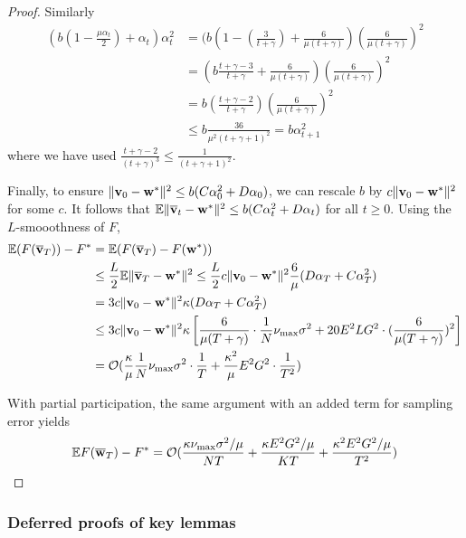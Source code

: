 \begin{proof}
Similarly 
\begin{align*}
(b(1-\frac{\mu\alpha_{t}}{2})+\alpha_{t})\alpha_{t}^{2} & =(b(1-(\frac{3}{t+\gamma})+\frac{6}{\mu(t+\gamma)})(\frac{6}{\mu(t+\gamma)})^{2}\\
& =(b\frac{t+\gamma-3}{t+\gamma}+\frac{6}{\mu(t+\gamma)})(\frac{6}{\mu(t+\gamma)})^{2}\\
& =b(\frac{t+\gamma-2}{t+\gamma})(\frac{6}{\mu(t+\gamma)})^{2}\\
& \leq b\frac{36}{\mu^{2}(t+\gamma+1)^{2}}=b\alpha_{t+1}^{2}
\end{align*}
where we have used $\frac{t+\gamma-2}{(t+\gamma)^{3}}\leq\frac{1}{(t+\gamma+1)^{2}}$.

Finally, to ensure $\|{\mathbf{v}}_{0}-{\mathbf{w}}^{\ast}\|^{2}\leq b(C\alpha_{0}^{2}+D\alpha_{0})$,
we can rescale $b$ by $c\|{\mathbf{v}}_{0}-{\mathbf{w}}^{\ast}\|^{2}$ for some $c.$ It
follows that $\mathbb{E}\|{\overline{\mathbf{v}}}_{t}-{\mathbf{w}}^{\ast}\|^{2}\leq b(C\alpha_{t}^{2}+D\alpha_{t})$
for all $t\geq0$. Using the $L$-smooothness of $F$,
\begin{align*}
\mathbb{E}(F({\overline{\mathbf{v}}}_{T}))-F^{\ast} & =\mathbb{E}(F({\overline{\mathbf{v}}}_{T})-F({\mathbf{w}}^{\ast}))\\
& \leq\frac{L}{2}\mathbb{E}\|{\overline{\mathbf{v}}}_{T}-{\mathbf{w}}^{\ast}\|^{2}\leq\frac{L}{2}c\|{\mathbf{v}}_{0}-{\mathbf{w}}^{\ast}\|^{2}\frac{6}{\mu}(D\alpha_{T}+C\alpha_{T}^{2})\\
& =3c\|{\mathbf{v}}_{0}-{\mathbf{w}}^{\ast}\|^{2}\kappa(D\alpha_{T}+C\alpha_{T}^{2})\\
& \leq3c\|{\mathbf{v}}_{0}-{\mathbf{w}}^{\ast}\|^{2}\kappa\left[\frac{6}{\mu(T+\gamma)}\cdot\frac{1}{N}\nu_{\max}\sigma^{2}+20E^{2}LG^{2}\cdot(\frac{6}{\mu(T+\gamma)})^{2}\right]\\
& =\mathcal{O}(\frac{\kappa}{\mu}\frac{1}{N}\nu_{\max}\sigma^{2}\cdot\frac{1}{T}+\frac{\kappa^{2}}{\mu}E^{2}G^{2}\cdot\frac{1}{T^{2}})
\end{align*}

With partial participation, the same argument with an added term for sampling error yields
\begin{align*}
\mathbb{E}F({\overline{\mathbf{w}}}_{T})-F^{\ast}=\mathcal{O}(\frac{\kappa\nu_{\max}\sigma^{2}/\mu}{NT}+\frac{\kappa E^{2}G^{2}/\mu}{KT}+\frac{\kappa^{2}E^{2}G^{2}/\mu}{T^{2}})
\end{align*}
\end{proof}

\subsubsection{Deferred proofs of key lemmas}

